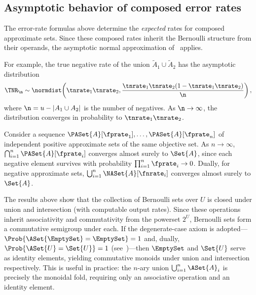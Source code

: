 \subsection{Asymptotic behavior of composed error rates}

The error-rate formulas above determine the \emph{expected} rates for composed approximate sets.
Since these composed rates inherit the Bernoulli structure from their operands, the asymptotic normal approximation of~\cite{bernoulliSets} applies.

For example, the true negative rate of the union $\tilde{A}_1 \cup \tilde{A}_2$ has the asymptotic distribution
\begin{equation}
\TNR_\n \sim \normdist\!\left(\tnrate_1 \tnrate_2, \frac{\tnrate_1 \tnrate_2 (1-\tnrate_1 \tnrate_2)}{\n}\right),
\end{equation}
where $\n = u - |A_1 \cup A_2|$ is the number of negatives.
As $\n \to \infty$, the distribution converges in probability to $\tnrate_1 \tnrate_2$.

\begin{remark}
	Consider a sequence $\PASet{A}[\fprate_1],\ldots,\PASet{A}[\fprate_n]$ of independent positive approximate sets of the same objective set.
	As $n \to \infty$, $\bigcap_{i=1}^{n} \PASet{A}[\fprate_i]$ converges almost surely to $\Set{A}$, since each negative element survives with probability $\prod_{i=1}^{n} \fprate_i \to 0$.
	Dually, for negative approximate sets, $\bigcup_{i=1}^{n} \NASet{A}[\fnrate_i]$ converges almost surely to $\Set{A}$.
\end{remark}

\begin{remark}
\label{rem:monoid}
The results above show that the collection of Bernoulli sets over $U$ is
closed under union and intersection (with computable output rates).
Since these operations inherit associativity and commutativity from the
powerset $2^U$, Bernoulli sets form a commutative semigroup under each.
If the degenerate-case axiom is adopted---$\Prob{\ASet{\EmptySet} =
\EmptySet} = 1$ and, dually, $\Prob{\ASet{U} = \Set{U}} = 1$ (see~\cite{bernoulliSets})---then $\EmptySet$ and $\Set{U}$ serve as
identity elements, yielding commutative monoids under union and
intersection respectively.
This is useful in practice: the $n$-ary union
$\bigcup_{i=1}^{n} \ASet{A}_i$ is precisely the monoidal fold, requiring only an
associative operation and an identity element.
\end{remark}
